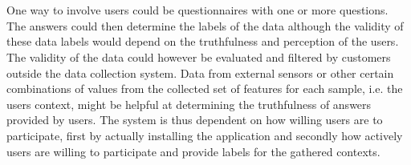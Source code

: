 \\\\
One way to involve users could be questionnaires with one or more questions. The answers could then determine the labels of the data although the validity of these data labels would depend on the truthfulness and perception of the users. The validity of the data could however be evaluated and filtered by customers outside the data collection system. Data from external sensors or other certain combinations of values from the collected set of features for each sample, i.e. the users context, might be helpful at determining the truthfulness of answers provided by users.
The system is thus dependent on how willing users are to participate, first by actually installing the application and secondly how actively users are willing to participate and provide labels for the gathered contexts.
